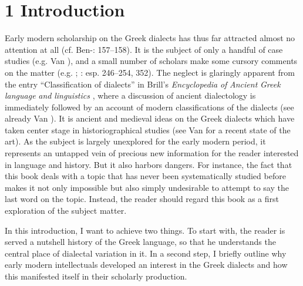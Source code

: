 \documentclass[output=paper]{langsci/langscibook}
\begin{document}
\section{1  Introduction}
\hypertarget{Toc19704802}{}
Early modern scholarship on the Greek dialects has thus far attracted almost no attention at all (cf. Ben-\citealt{Tov2009}: 157–158). It is the subject of only a handful of case studies (e.g. Van \citealt{Rooy2016c}), and a small number of scholars make some cursory comments on the matter (e.g. \citealt{Botley2010}; \citealt{Roelcke2014}: esp. 246–254, 352). The neglect is glaringly apparent from the entry “Classification of dialects” in Brill’s \textit{Encyclopedia} \textit{of} \textit{Ancient} \textit{Greek} \textit{language} \textit{and} \textit{linguistics} \citep{Finkelberg2014}, where a discussion of ancient dialectology is immediately followed by an account of modern classifications of the dialects (see already Van \citealt{Rooy2016a}). It is ancient and medieval ideas on the Greek dialects which have taken center stage in historiographical studies (see Van \citealt{Rooy2018b} for a recent state of the art). As the subject is largely unexplored for the early modern period, it represents an untapped vein of precious new information for the reader interested in language and history. But it also harbors dangers. For instance, the fact that this book deals with a topic that has never been systematically studied before makes it not only impossible but also simply undesirable to attempt to say the last word on the topic. Instead, the reader should regard this book as a first exploration of the subject matter.

In this introduction, I want to achieve two things. To start with, the reader is served a nutshell history of the Greek language, so that he understands the central place of dialectal variation in it. In a second step, I briefly outline why early modern intellectuals developed an interest in the Greek dialects and how this manifested itself in their scholarly production.
\end{document}
